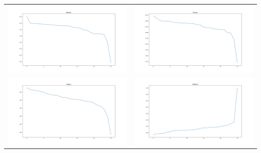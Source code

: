 \begin{longtable}{cc}
\centering
    \includegraphics[scale=0.2]{./images/mixup_position/all/WordAcc.png} &
    \includegraphics[scale=0.2]{./images/mixup_position/all/CharAcc.png} \\
    \includegraphics[scale=0.2]{./images/mixup_position/all/FragAcc.png} &
    \includegraphics[scale=0.2]{./images/mixup_position/all/ValidLoss.png} \\

\end{longtable}
